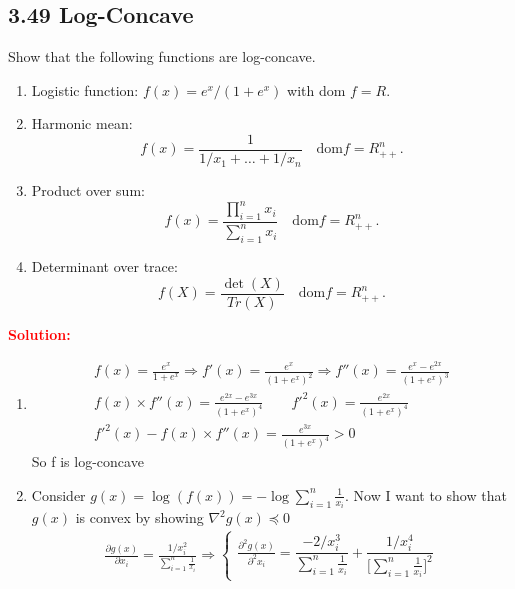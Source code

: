 \begin{latin}

\section{3.49 Log-Concave}
Show that the following functions are log-concave.

\begin{enumerate}
	\item Logistic function: $ f(x) = e^{x}/(1 + e^{x}) $ with dom $ f = R $.
	\item Harmonic mean:
		\begin{equation*}
			f(x) = \frac{1}{1/x_{1} + \dots + 1/x_{n}}  \quad \text{dom} f = R^{n}_{++}.
		\end{equation*}
	\item Product over sum:
		\begin{equation*}
			f(x) = \frac{\prod_{i=1}^{n} x_{i}}{\sum_{i=1}^{n} x_{i}}  \quad \text{dom} f = R^{n}_{++}.
		\end{equation*}
	\item Determinant over trace:
		\begin{equation*}
			f(X) = \frac{\det(X)}{Tr(X)}  \quad \text{dom} f = R^{n}_{++}.
		\end{equation*}
\end{enumerate}
\textcolor{red}{\textbf{Solution:}}
\\
\begin{enumerate}
	\item
	\begin{gather*}
		f(x) = \frac{e^{x}}{1 + e^{x}} \Rightarrow f'(x) = \frac{e^{x}}{(1 + e^{x})^{2}} \Rightarrow f''(x) = \frac{e^{x} - e^{2x}}{(1 + e^{x})^{3}}
		\\
		f(x) \times f''(x) = \frac{e^{2x} - e^{3x}}{(1 + e^{x})^{4}} 
		\qquad
		f'^{2}(x) = \frac{e^{2x}}{(1 + e^{x})^{4}}
		\\
		f'^{2}(x) - f(x) \times f''(x) = \frac{e^{3x}}{(1 + e^{x})^{4}} > 0 
	\end{gather*}
	So f is log-concave
	\item
	Consider $ g(x) = \log (f(x)) = - \log \sum_{i=1}^{n} \frac{1}{x_{i}} $. Now I want to show that $ g(x) $ is convex by showing $ \nabla^{2}g(x) \preceq 0 $
	\begin{gather*}
		\frac{\partial g(x)}{\partial x_{i}} = \frac{1/x_{i}^{2}}{\sum_{i=1}^{n} \frac{1}{x_{i}}} \Rightarrow \begin{cases}
			\frac{\partial^{2} g(x)}{\partial^{2} x_{i}} = \dfrac{-2/x_{i}^{3}}{\sum_{i=1}^{n} \frac{1}{x_{i}}} + \dfrac{1/x_{i}^{4}}{\bigg[\sum_{i=1}^{n} \frac{1}{x_{i}}\bigg]^{2}}

\end{cases}
\end{gather*}
\end{enumerate}
\end{latin}
